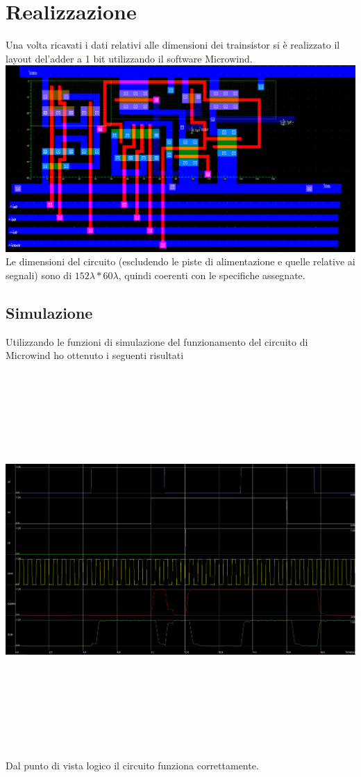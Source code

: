 \documentclass[12pt]{article} %
\begin{document}
\section{Realizzazione}
Una volta ricavati i dati relativi alle dimensioni dei trainsistor si è realizzato il layout del'adder a 1 bit utilizzando il software Microwind.\\
\includegraphics[scale=0.4]{Layout1_152x60}
Le dimensioni del circuito (escludendo le piste di alimentazione e quelle relative ai segnali) sono di $152 \lambda * 60 \lambda$, quindi coerenti con le specifiche assegnate.

\subsection{Simulazione}
Utilizzando le funzioni di simulazione del funzionamento del circuito di Microwind ho ottenuto i seguenti risultati\\
\includegraphics[width = 160mm, height = 150mm]{plot_microwind_layout1}
Dal punto di vista logico il circuito funziona correttamente.
\end{document}
